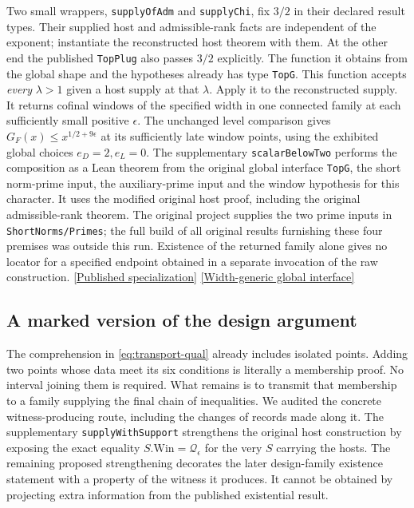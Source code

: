 \documentclass[12pt,letterpaper]{article}
\begin{document}
Two small wrappers, \texttt{supplyOfAdm} and \texttt{supplyChi}, fix \(3/2\) in their declared result types. Their supplied host and admissible-rank facts are independent of the exponent; instantiate the reconstructed host theorem with them. At the other end the published \texttt{TopPlug} also passes \(3/2\) explicitly. The function it obtains from the global shape and the hypotheses already has type \texttt{TopG}. This function accepts \emph{every} \(\lambda>1\) given a host supply at that \(\lambda\). Apply it to the reconstructed supply. It returns cofinal windows of the specified width in one connected family at each sufficiently small positive \(\epsilon\). The unchanged level comparison gives \(G_F(x)\le x^{1/2+9\epsilon}\) at its sufficiently late window points, using the exhibited global choices \(e_D=2,e_L=0\). The supplementary \texttt{scalarBelowTwo} performs the composition as a Lean theorem from the original global interface \texttt{TopG}, the short norm-prime input, the auxiliary-prime input and the window hypothesis for this character. It uses the modified original host proof, including the original admissible-rank theorem. The original project supplies the two prime inputs in \texttt{ShortNorms/Primes}; the full build of all original results furnishing these four premises was outside this run. Existence of the returned family alone gives no locator for a specified endpoint obtained in a separate invocation of the raw construction.
\href{https://github.com/nousentllc/riemann-hypothesis/blob/40e56bab026552e089d7afcfeff08d2defb9c005/src/Development/AutomorphicArithmetic/ThetaCorrespondence/ThetaPairLifts/ThirdPlaceSeries/TopPlug.lean#L12-L18}{[Published specialization]}
\href{https://github.com/nousentllc/riemann-hypothesis/blob/40e56bab026552e089d7afcfeff08d2defb9c005/src/Development/AutomorphicArithmetic/CharacterBoxes/ZeroFreeAllOfTopG.lean#L12-L33}{[Width-generic global interface]}

\subsection{A marked version of the design argument}

The comprehension in \eqref{eq:transport-qual} already includes isolated points. Adding two points whose data meet its six conditions is literally a membership proof. No interval joining them is required. What remains is to transmit that membership to a family supplying the final chain of inequalities. We audited the concrete witness-producing route, including the changes of records made along it. The supplementary \texttt{supplyWithSupport} strengthens the original host construction by exposing the exact equality \(S.\mathrm{Win}=\mathcal Q_\epsilon\) for the very \(S\) carrying the hosts. The remaining proposed strengthening decorates the later design-family existence statement with a property of the witness it produces. It cannot be obtained by projecting extra information from the published existential result.
\end{document}
